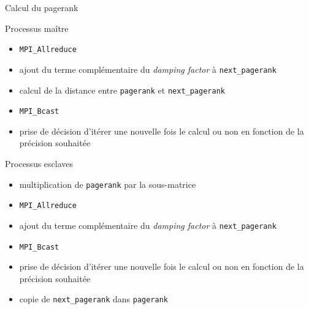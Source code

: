 \documentclass{beamer}
\begin{document}
  \begin{frame}{Calcul du pagerank}
    \begin{minipage}[c]{.45\linewidth}
      \begin{block}{Processus maître}
        \scriptsize{\begin{itemize}
          \vspace{0.7cm}
          \item<2-> \texttt{MPI\_Allreduce}
          \item<3-> ajout du terme complémentaire du \textit{damping factor} à \texttt{next\_pagerank}
          \item<4-> calcul de la distance entre \texttt{pagerank} et \texttt{next\_pagerank}
          \item<5-> \texttt{MPI\_Bcast}
          \item<6-> prise de décision d'itérer une nouvelle fois le calcul ou non en fonction de la précision souhaitée 
          \vspace{0.9cm}
        \end{itemize}}
      \end{block}
    \end{minipage} \hfill
    \begin{minipage}[c]{.45\linewidth}
      \begin{block}{Processus esclaves}
        \scriptsize{\begin{itemize}
          \item<1-> multiplication de \texttt{pagerank} par la sous-matrice
          \item<2-> \texttt{MPI\_Allreduce}
          \item<3-> ajout du terme complémentaire du \textit{damping factor} à \texttt{next\_pagerank}
          \vspace{0.8cm}
          \item<5-> \texttt{MPI\_Bcast}
          \item<6-> prise de décision d'itérer une nouvelle fois le calcul ou non en fonction de la précision souhaitée 
          \item<7-> copie de \texttt{next\_pagerank} dans \texttt{pagerank}
        \end{itemize}}
      \end{block}
    \end{minipage}
  \end{frame}
  
\end{document}
